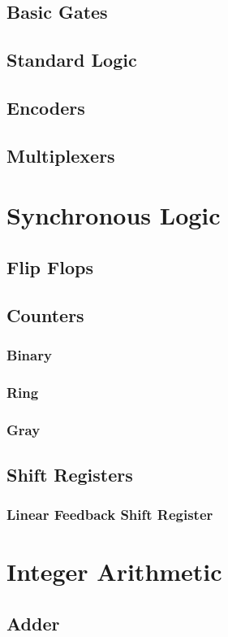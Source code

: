 \documentclass[a4paper,11pt]{book}
\begin{document}
\section{Basic Gates}
\section{Standard Logic}
\section{Encoders}
\section{Multiplexers}

\chapter{Synchronous Logic}
\section{Flip Flops}
\section{Counters}
\subsection{Binary}
\subsection{Ring}
\subsection{Gray}
\section{Shift Registers}
\subsection{Linear Feedback Shift Register}

\chapter{Integer Arithmetic}
\section{Adder}
\end{document}

